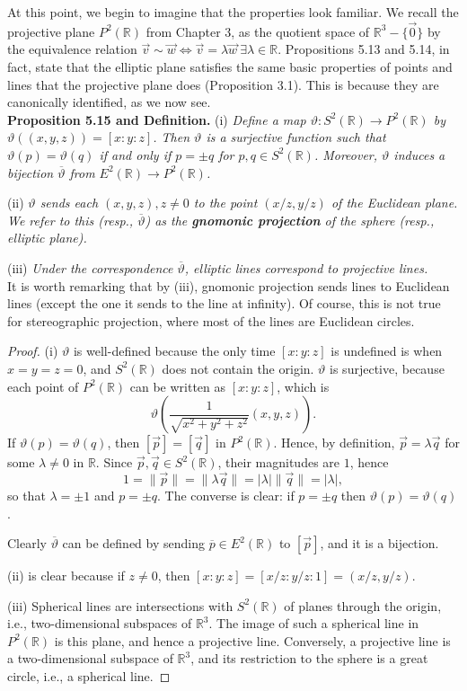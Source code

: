\documentclass[leqno]{book}
\begin{document}
\noindent At this point, we begin to imagine that the properties look familiar.  We recall the projective plane $P^2(\mathbb R)$ from Chapter 3, as the quotient space of $\mathbb R^3-\{\vec 0\}$ by the equivalence relation $\vec v\sim\vec w\iff\vec v=\lambda\vec w~\exists\lambda\in\mathbb R$.  Propositions 5.13 and 5.14, in fact, state that the elliptic plane satisfies the same basic properties of points and lines that the projective plane does (Proposition 3.1).  This is because they are canonically identified, as we now see.\\

\noindent\textbf{Proposition 5.15 and Definition.} (i) \emph{Define a map $\vartheta:S^2(\mathbb R)\to P^2(\mathbb R)$ by $\vartheta((x,y,z))=[x:y:z]$.  Then $\vartheta$ is a surjective function such that $\vartheta(p)=\vartheta(q)$ if and only if $p=\pm q$ for $p,q\in S^2(\mathbb R)$.  Moreover, $\vartheta$ induces a bijection $\overline{\vartheta}$ from $E^2(\mathbb R)\to P^2(\mathbb R)$.}

(ii) \emph{$\vartheta$ sends each $(x,y,z),z\ne 0$ to the point $(x/z,y/z)$ of the Euclidean plane.  We refer to this (resp., $\overline{\vartheta}$) as the \textbf{gnomonic projection} of the sphere (resp., elliptic plane).}

(iii) \emph{Under the correspondence $\overline{\vartheta}$, elliptic lines correspond to projective lines.}\\

\noindent It is worth remarking that by (iii), gnomonic projection sends lines to Euclidean lines (except the one it sends to the line at infinity).  Of course, this is not true for stereographic projection, where most of the lines are Euclidean circles.
\begin{proof}
(i) $\vartheta$ is well-defined because the only time $[x:y:z]$ is undefined is when $x=y=z=0$, and $S^2(\mathbb R)$ does not contain the origin.  $\vartheta$ is surjective, because each point of $P^2(\mathbb R)$ can be written as $[x:y:z]$, which is
$$\vartheta\left(\frac 1{\sqrt{x^2+y^2+z^2}}(x,y,z)\right).$$
If $\vartheta(p)=\vartheta(q)$, then $[\vec p]=[\vec q]$ in $P^2(\mathbb R)$.  Hence, by definition, $\vec p=\lambda\vec q$ for some $\lambda\ne 0$ in $\mathbb R$.  Since $\vec p,\vec q\in S^2(\mathbb R)$, their magnitudes are $1$, hence
$$1=\|\vec p\|=\|\lambda\vec q\|=|\lambda|\|\vec q\|=|\lambda|,$$
so that $\lambda=\pm 1$ and $p=\pm q$.  The converse is clear: if $p=\pm q$ then $\vartheta(p)=\vartheta(q)$.

Clearly $\overline{\vartheta}$ can be defined by sending $\overline p\in E^2(\mathbb R)$ to $[\vec p]$, and it is a bijection.

(ii) is clear because if $z\ne 0$, then $[x:y:z]=[x/z:y/z:1]=(x/z,y/z)$.

(iii) Spherical lines are intersections with $S^2(\mathbb R)$ of planes through the origin, i.e., two-dimensional subspaces of $\mathbb R^3$.  The image of such a spherical line in $P^2(\mathbb R)$ is this plane, and hence a projective line.  Conversely, a projective line is a two-dimensional subspace of $\mathbb R^3$, and its restriction to the sphere is a great circle, i.e., a spherical line.
\end{proof}
\end{document}
